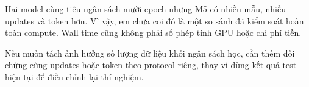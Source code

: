 \documentclass[12pt,a4paper]{article}
\begin{document}
Hai model cùng tiêu ngân sách mười epoch nhưng M5 có nhiều mẫu, nhiều updates và token hơn. Vì vậy, em chưa coi đó là một so sánh đã kiểm soát hoàn toàn compute. Wall time cũng không phải số phép tính GPU hoặc chi phí tiền.

Nếu muốn tách ảnh hưởng số lượng dữ liệu khỏi ngân sách học, cần thêm đối chứng cùng updates hoặc token theo protocol riêng, thay vì dùng kết quả test hiện tại để điều chỉnh lại thí nghiệm.
\end{document}
